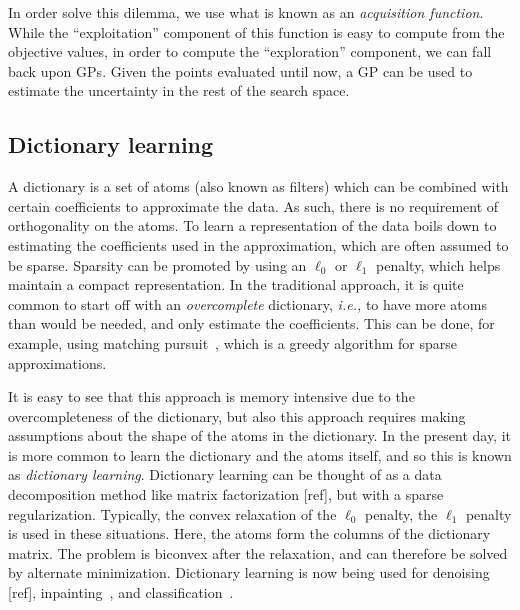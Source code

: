 In order solve this dilemma, we use what is known as an \emph{acquisition function}. While the ``exploitation'' component of this function is easy to compute from the objective values, in order to compute the ``exploration'' component, we can fall back upon \acp{GP}. Given the points evaluated until now, a \ac{GP} can be used to estimate the uncertainty in the rest of the search space. 

\subsection{Dictionary learning}

A dictionary is a set of atoms (also known as filters) which can be combined with certain coefficients to approximate the data. As such, there is no requirement of orthogonality on the atoms. To learn a representation of the data boils down to estimating the coefficients used in the approximation, which are often assumed to be sparse. Sparsity can be promoted by using an $\ell_0$ or $\ell_1$ penalty, which helps maintain a compact representation. In the traditional approach, it is quite common to start off with an \emph{overcomplete} dictionary, \emph{i.e.,} to have more atoms than would be needed, and only estimate the coefficients. This can be done, for example, using matching pursuit~\citep{mallat1993matching}, which is a greedy algorithm for sparse approximations.

It is easy to see that this approach is memory intensive due to the overcompleteness of the dictionary, but also this approach requires making assumptions about the shape of the atoms in the dictionary. In the present day, it is more common to learn the dictionary and the atoms itself, and so this is known as \emph{dictionary learning}. Dictionary learning can be thought of as a data decomposition method like matrix factorization [ref], but with a sparse regularization. Typically, the convex relaxation of the $\ell_0$ penalty, the $\ell_1$ penalty is used in these situations. Here, the atoms form the columns of the dictionary matrix. The problem is biconvex after the relaxation, and can therefore be solved by alternate minimization. Dictionary learning is now being used for denoising [ref], inpainting~\citep{mairal2009online}, and classification~\citep{mairal2009supervised}. 

